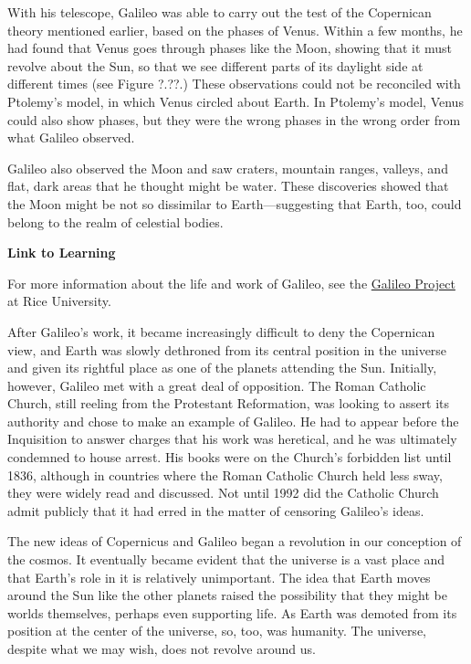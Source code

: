 \documentclass[main.tex]{subfiles}
\begin{document}
With his telescope, Galileo was able to carry out the test of the Copernican theory mentioned earlier, based on the phases of Venus. Within a few months, he had found that Venus goes through phases like the Moon, showing that it must revolve about the Sun, so that we see different parts of its daylight side at different times (see Figure ?.??.) These observations could not be reconciled with Ptolemy's model, in which Venus circled about Earth. In Ptolemy's model, Venus could also show phases, but they were the wrong phases in the wrong order from what Galileo observed.

\vspace{1em}

Galileo also observed the Moon and saw craters, mountain ranges, valleys, and flat, dark areas that he thought might be water. These discoveries showed that the Moon might be not so dissimilar to Earth---suggesting that Earth, too, could belong to the realm of celestial bodies.

\begin{mdframed}[backgroundcolor=black!10]
    \textbf{Link to Learning}

    \vspace{1ex}

    For more information about the life and work of Galileo, see the \href{https://openstax.org/l/30GalProj}{Galileo Project} at Rice University.
\end{mdframed}

After Galileo's work, it became increasingly difficult to deny the Copernican view, and Earth was slowly dethroned from its central position in the universe and given its rightful place as one of the planets attending the Sun. Initially, however, Galileo met with a great deal of opposition. The Roman Catholic Church, still reeling from the Protestant Reformation, was looking to assert its authority and chose to make an example of Galileo. He had to appear before the Inquisition to answer charges that his work was heretical, and he was ultimately condemned to house arrest. His books were on the Church's forbidden list until 1836, although in countries where the Roman Catholic Church held less sway, they were widely read and discussed. Not until 1992 did the Catholic Church admit publicly that it had erred in the matter of censoring Galileo's ideas.

\vspace{1em}

The new ideas of Copernicus and Galileo began a revolution in our conception of the cosmos. It eventually became evident that the universe is a vast place and that Earth's role in it is relatively unimportant. The idea that Earth moves around the Sun like the other planets raised the possibility that they might be worlds themselves, perhaps even supporting life. As Earth was demoted from its position at the center of the universe, so, too, was humanity. The universe, despite what we may wish, does not revolve around us.
\end{document}
